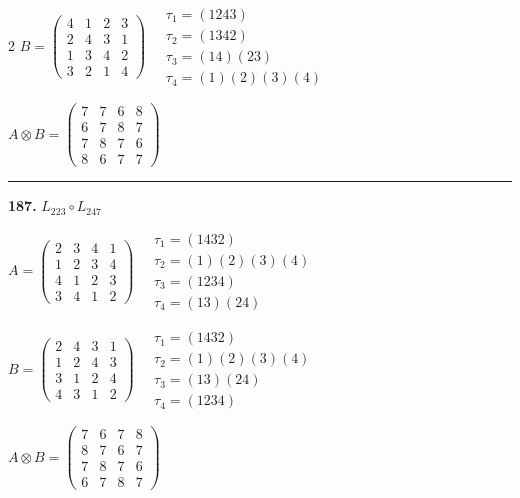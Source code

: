 \begin{multicols}{2}
$B = \begin{pmatrix} 4 & 1 & 2 & 3 \\ 2 & 4 & 3 & 1 \\ 1 & 3 & 4 & 2 \\ 3 & 2 & 1 & 4 \end{pmatrix} \quad \begin{matrix} \tau_{1}=(1 2 4 3) \\ \tau_{2}=(1 3 4 2) \\ \tau_{3}=(1 4)(2 3) \\ \tau_{4}=(1)(2)(3)(4) \end{matrix}$

$A \otimes B = \begin{pmatrix} 7 & 7 & 6 & 8 \\ 6 & 7 & 8 & 7 \\ 7 & 8 & 7 & 6 \\ 8 & 6 & 7 & 7 \end{pmatrix}$

\vspace{0.3em}
\hrule
\vspace{0.3em}

\noindent\textbf{187.} $L_{223} \circ L_{247}$

$A = \begin{pmatrix} 2 & 3 & 4 & 1 \\ 1 & 2 & 3 & 4 \\ 4 & 1 & 2 & 3 \\ 3 & 4 & 1 & 2 \end{pmatrix} \quad \begin{matrix} \tau_{1}=(1 4 3 2) \\ \tau_{2}=(1)(2)(3)(4) \\ \tau_{3}=(1 2 3 4) \\ \tau_{4}=(1 3)(2 4) \end{matrix}$

$B = \begin{pmatrix} 2 & 4 & 3 & 1 \\ 1 & 2 & 4 & 3 \\ 3 & 1 & 2 & 4 \\ 4 & 3 & 1 & 2 \end{pmatrix} \quad \begin{matrix} \tau_{1}=(1 4 3 2) \\ \tau_{2}=(1)(2)(3)(4) \\ \tau_{3}=(1 3)(2 4) \\ \tau_{4}=(1 2 3 4) \end{matrix}$

$A \otimes B = \begin{pmatrix} 7 & 6 & 7 & 8 \\ 8 & 7 & 6 & 7 \\ 7 & 8 & 7 & 6 \\ 6 & 7 & 8 & 7 \end{pmatrix}$


\end{multicols}

